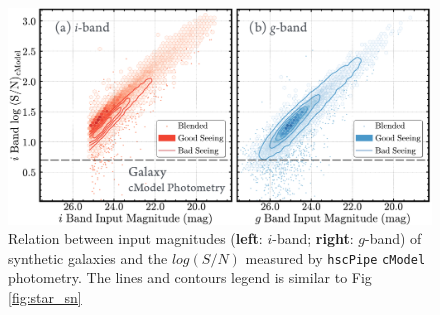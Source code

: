 \documentclass[useamsfonts]{pasj01}
\def\hscpipe{\texttt{hscPipe}}
\def\cmodel{\texttt{cModel}}
\begin{document}
\begin{figure}
    \begin{center}
        \includegraphics[width=\textwidth]{fig/synpipe_galaxy_sn}
    \end{center}
    \caption{
        Relation between input magnitudes (\textbf{left}: $i$-band; \textbf{right}:
        $g$-band) of synthetic galaxies and the $log(S/N)$ measured by \hscpipe{}
        \cmodel{} photometry.
        The lines and contours legend is similar to Fig \ref{fig:star_sn}
        }
    \label{fig:cmodel_sn}
\end{figure}
\end{document}
